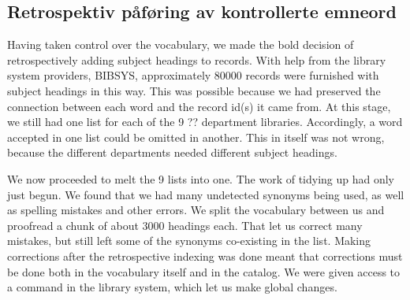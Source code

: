 \subsection{Retrospektiv påføring av kontrollerte emneord}

Having taken control over the vocabulary, we made the bold decision of retrospectively adding subject headings to records. With help from the library system providers, BIBSYS, approximately 80000 records were furnished with subject headings in this way. This was possible because we had preserved the connection between each word and the record id(s) it came from. At this stage, we still had one list for each of the 9 ?? department libraries. Accordingly, a word accepted in one list could be omitted in another. This in itself was not wrong, because the different departments needed different subject headings. 

We now proceeded to melt the 9 lists into one. The work of tidying up had only just begun. We found that we had many undetected synonyms being used, as well as spelling mistakes and other errors. We split the vocabulary between us and proofread a chunk of about 3000 headings each. That let us correct many mistakes, but still left some of the synonyms co-existing in the list. Making corrections after the retrospective indexing was done meant that corrections must be done both in the vocabulary itself and in the catalog. We were given access to a command in the library system, which let us make global changes. 

